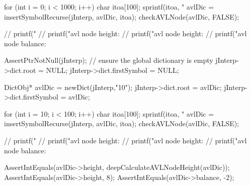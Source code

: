   for (int i = 0; i < 1000; i++) {
    char itoa[100];
    sprintf(itoa, "%
    avlDic = insertSymbolRecurse(jInterp, avlDic, itoa);
  }
  checkAVLNode(avlDic, FALSE);

//  printf("%
//  printf("avl node height: %
//  printf("avl node height: %
//  printf("avl node balance: %
\stopCTest
\stopTestCase

\startCTest
  AssertPtrNotNull(jInterp);
  // ensure the global dictionary is empty
  jInterp->dict.root        = NULL;
  jInterp->dict.firstSymbol = NULL;

  DictObj* avlDic = newDict(jInterp,"10");
  jInterp->dict.root        = avlDic;
  jInterp->dict.firstSymbol = avlDic;

  for (int i = 10; i < 100; i++) {
    char itoa[100];
    sprintf(itoa, "%
    avlDic = insertSymbolRecurse(jInterp, avlDic, itoa);
  }
  checkAVLNode(avlDic, FALSE);

//  printf("%
//  printf("avl node height: %
//  printf("avl node height: %
//  printf("avl node balance: %

  AssertIntEquals(avlDic->height, deepCalculateAVLNodeHeight(avlDic));
  AssertIntEquals(avlDic->height, 8);
  AssertIntEquals(avlDic->balance, -2);
\stopCTest
\stopTestCase
\stopTestSuite